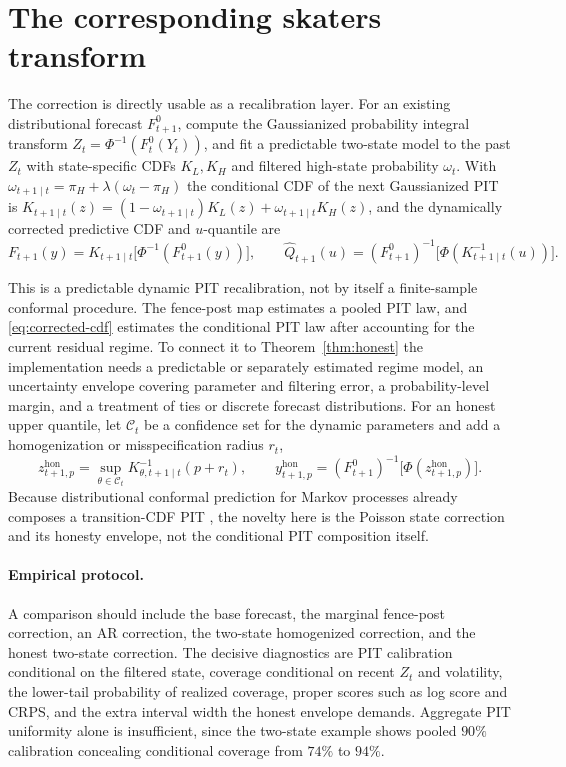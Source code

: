 \documentclass[11pt]{article}
\theoremstyle{definition}
\theoremstyle{remark}
\begin{document}
\section{The corresponding skaters transform}\label{sec:skaters}

The correction is directly usable as a recalibration layer. For an existing distributional
forecast $F^0_{t+1}$, compute the Gaussianized probability integral transform $Z_t=
\Phi^{-1}(F^0_t(Y_t))$, and fit a predictable two-state model to the past $Z_t$ with
state-specific CDFs $K_L,K_H$ and filtered high-state probability $\omega_t$. With
$\omega_{t+1\mid t}=\pi_H+\lambda(\omega_t-\pi_H)$ the conditional CDF of the next Gaussianized
PIT is $K_{t+1\mid t}(z)=(1-\omega_{t+1\mid t})K_L(z)+\omega_{t+1\mid t}K_H(z)$, and the
dynamically corrected predictive CDF and $u$-quantile are
\begin{equation}\label{eq:corrected-cdf}
  F_{t+1}(y) = K_{t+1\mid t}\big[\Phi^{-1}(F^0_{t+1}(y))\big],
  \qquad
  \widehat Q_{t+1}(u) = (F^0_{t+1})^{-1}\big[\Phi(K^{-1}_{t+1\mid t}(u))\big] .
\end{equation}

This is a predictable dynamic PIT recalibration, not by itself a finite-sample conformal
procedure. The fence-post map estimates a pooled PIT law, and \eqref{eq:corrected-cdf}
estimates the conditional PIT law after accounting for the current residual regime. To connect
it to Theorem~\ref{thm:honest} the implementation needs a predictable or separately estimated
regime model, an uncertainty envelope covering parameter and filtering error, a
probability-level margin, and a treatment of ties or discrete forecast distributions. For an
honest upper quantile, let $\mathcal{C}_t$ be a confidence set for the dynamic parameters and
add a homogenization or misspecification radius $r_t$,
\begin{equation}\label{eq:honest-skater}
  z^{\mathrm{hon}}_{t+1,p} = \sup_{\theta\in\mathcal{C}_t} K^{-1}_{\theta,t+1\mid t}(p+r_t),
  \qquad
  y^{\mathrm{hon}}_{t+1,p} = (F^0_{t+1})^{-1}\big[\Phi(z^{\mathrm{hon}}_{t+1,p})\big] .
\end{equation}
Because distributional conformal prediction for Markov processes already composes a
transition-CDF PIT \citep{dai2024markov}, the novelty here is the Poisson state correction and
its honesty envelope, not the conditional PIT composition itself.

\paragraph{Empirical protocol.} A comparison should include the base forecast, the marginal
fence-post correction, an AR correction, the two-state homogenized correction, and the honest
two-state correction. The decisive diagnostics are PIT calibration conditional on the filtered
state, coverage conditional on recent $Z_t$ and volatility, the lower-tail probability of
realized coverage, proper scores such as log score and CRPS, and the extra interval width the
honest envelope demands. Aggregate PIT uniformity alone is insufficient, since the two-state
example shows pooled $90\%$ calibration concealing conditional coverage from $74\%$ to $94\%$.
\end{document}
